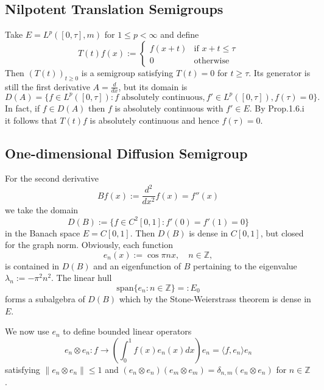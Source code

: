 \subsection{Nilpotent Translation Semigroups}
Take $E=L^p([0,\tau],m)$ for $1 \leq p < \infty$ and define
\[
T(t)f(x) := \begin{cases}
f(x+t) & \text{if } x+t \leq \tau \\
0 & \text{otherwise}
\end{cases}
\]
Then $(T(t))_{t \geq 0}$ is a semigroup satisfying $T(t)=0$ for $t \geq \tau$.
Its generator is still the first derivative $A=\frac{d}{dx}$, but its domain is
\[
D(A) = \{f \in L^p([0,\tau]) \colon f \text{ absolutely continuous}, f' \in L^p([0,\tau]), f(\tau)=0\}.
\]
In fact, if $f \in D(A)$ then $f$ is absolutely continuous with $f' \in E$.
By Prop.1.6.i it follows that $T(t)f$ is absolutely continuous and hence $f(\tau)=0$.
\subsection{One-dimensional Diffusion Semigroup}
For the second derivative
\[
Bf(x) := \frac{d^2}{dx^2}f(x) = f''(x)
\]
we take the domain
\[
D(B) := \{f \in C^2[0,1] \colon f'(0)=f'(1)=0\}
\]
in the Banach space $E=C[0,1]$.
Then $D(B)$ is dense in $C[0,1]$, but closed for the graph norm.
Obviously, each function
\[
e_{n}(x) := \cos \pi nx, \quad n \in \mathbb{Z},
\]
is contained in $D(B)$ and an eigenfunction of $B$ pertaining to the eigenvalue $\lambda_{n} := -\pi^2n^2$.
The linear hull
\[
\text{span}\{e_{n} \colon n \in \mathbb{Z}\} = \colon E_0
\]
forms a subalgebra of $D(B)$ which by the Stone-Weierstrass theorem is dense in $E$.

We now use $e_{n}$ to define bounded linear operators
\[
e_{n} \otimes e_{n} \colon f \rightarrow \left(\int_0^1 f(x)e_{n}(x)dx\right)e_{n} = \langle f,e_{n}\rangle e_{n}
\]
satisfying $\|e_{n} \otimes e_{n}\| \leq 1$ and
$(e_{n} \otimes e_{n})(e_{m} \otimes e_{m}) = \delta_{n,m}(e_{n} \otimes e_{n})$ for $n \in \mathbb{Z}$.

